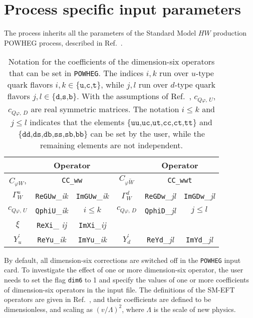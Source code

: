 \documentclass[paper]{JHEP3}
\newcommand\POWHEG{{\tt POWHEG}}
\begin{document}
\section{Process specific input parameters}

The process inherits all the parameters of the Standard Model $HW$ production POWHEG process,
described in Ref.\ \cite{Luisoni:2013kna}.


\begin{table}
\center
\begin{small}
\begin{tabular}{||c|cc||c|cc||}
\hline
								  &  \multicolumn{2}{|c||}{Operator} 	 					&
								  &  \multicolumn{2}{c||}{Operator} 												 \\
\hline
$C_{\varphi W}$, 			  & \multicolumn{2}{c||}{\texttt{CC\_ww}}      &   
$C_{\varphi \tilde{W}}$  	  & \multicolumn{2}{c||}{ \texttt{CC\_wwt}  }     \\ 								  
\hline
$\Gamma^u_W$ 		& \texttt{ReGUw}\_\textit{ik} & \texttt{ImGUw}\_\textit{ik}  				  		&
$\Gamma^d_W$ 		& \texttt{ReGDw}\_\textit{jl} & \texttt{ImGDw}\_\textit{jl} 				 		\\%
\hline
$c^{}_{Q\varphi,\, U}$ 	& \texttt{QphiU}\_\textit{ik}				&   $i \le k$ 	& 
$c^{}_{Q\varphi,\, D}$ 	& \texttt{QphiD}\_\textit{jl} 				&   $j \le l$  	\\
$\xi$          		&  \texttt{ReXi}\_{\textit{ ij}} & \texttt{ImXi}\_\textit{ij}  & & 	&\\ 
\hline
$Y^\prime_u$ 		& \texttt{ReYu}\_\textit{ik}  				&    \texttt{ImYu}\_\textit{ik} 	&
$Y^\prime_d$ 		& \texttt{ReYd}\_\textit{jl}				&    \texttt{ImYd}\_\textit{jl}	\\ 
\hline
\end{tabular}
\end{small}
\caption{Notation for the coefficients of the dimension-six operators that can be set in \POWHEG{}.
The indices $i, k$ run over $u$-type quark flavors $\textit{i},\textit{k} \in \{\texttt{u,c,t}\}$, while $j, l$ run over $d$-type quark flavors $\textit{j},\textit{l} \in \{\texttt{d,s,b}\}$.
With the assumptions of Ref.\ \cite{Alioli:2018ljm}, $c^{}_{Q\varphi,\, U}$, $c^{}_{Q\varphi,\, D}$
are real symmetric matrices. The notation $i \le k$ and $j \le l$ indicates that the elements $\{\texttt{uu,uc,ut,cc,ct,tt}\}$ 
and $\{\texttt{dd,ds,db,ss,sb,bb}\}$ can be set by the user, while the remaining elements are not independent. }\label{TabA}
\end{table}


By default, all dimension-six corrections are switched off in the \POWHEG{} input card.
To investigate the effect of one or more dimension-six operator, the user  needs to set the flag \texttt{dim6} to 1 and specify the values of 
one or more coefficients of dimension-six operators in the input file. The definitions of the SM-EFT operators are given in Ref.\ \cite{Alioli:2018ljm},
and their coefficients are defined to be dimensionless, and scaling as $(v/\Lambda)^2$, where $\Lambda$ is the scale of new physics.
\end{document}
